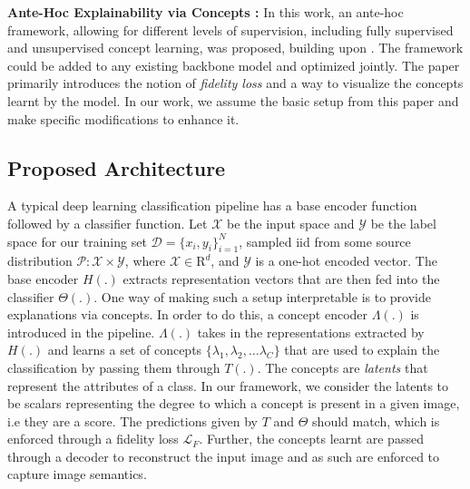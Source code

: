 \documentclass[letterpaper]{article}
\begin{document}
\textbf{Ante-Hoc Explainability via Concepts \cite{Sarkar2021AFF}:} In this work, an ante-hoc framework, allowing for different levels of supervision, including fully supervised and unsupervised concept learning, was proposed, building upon \cite{SENN}.
The framework could be added to any existing backbone model and optimized jointly. The paper primarily introduces the notion of \textit{fidelity loss} and a way to visualize the concepts learnt by the model.
In our work, we assume the basic setup from this paper and make specific modifications to enhance it.

\subsection{Proposed Architecture}\label{sec:arch}
A typical deep learning classification pipeline has a base encoder function followed by a classifier function. Let $\mathcal{X}$ be the input space and $\mathcal{Y}$ be the label space for our training set $\mathcal{D} = \{x_i, y_i\}_{i=1}^N$, sampled iid from some source distribution $\mathcal{P} : \mathcal{X} \times\mathcal{Y}$, where $\mathcal{X} \in \mathrm{R}^d$, and $\mathcal{Y}$ is a one-hot encoded vector. The base encoder $H(.)$ extracts representation vectors that are then fed into the classifier $\Theta(.)$. One way of making such a setup interpretable is to provide explanations via concepts. In order to do this, a concept encoder $\Lambda(.)$ is introduced in the pipeline. $\Lambda(.)$ takes in the representations extracted by $H(.)$ and learns a set of concepts $\{\lambda_1, \lambda_2,…\lambda_C\}$ that are used to explain the classification by passing them through $T(.)$. The concepts are \textit{latents} that represent the attributes of a class. In our framework, we consider the latents to be scalars representing the degree to which a concept is present in a given image, i.e they are a score. The predictions given by $T$ and $\Theta$ should match, which is enforced through a fidelity loss $\mathcal L_F$. Further, the concepts learnt are passed through a decoder to reconstruct the input image and as such are enforced to capture image semantics.
\end{document}
